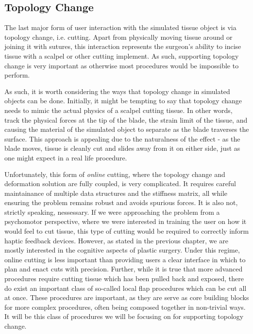 \documentclass[12pt,oneside,letterpaper]{memoir}
\begin{document}
  \subsection{Topology Change}

  The last major form of user interaction with the simulated tissue
  object is via topology change, i.e. cutting. Apart from physically
  moving tissue around or joining it with sutures, this interaction
  represents the surgeon's ability to incise tissue with a scalpel or
  other cutting implement. As such, supporting topology change is very
  important as otherwise most procedures would be impossible to
  perform.

  As such, it is worth considering the ways that topology change in
  simulated objects can be done. Initially, it might be tempting to
  say that topology change needs to mimic the actual physics of a
  scalpel cutting tissue. In other words, track the physical forces at
  the tip of the blade, the strain limit of the tissue, and causing
  the material of the simulated object to separate as the blade
  traverses the surface. This approach is appealing due to the
  naturalness of the effect - as the blade moves, tissue is cleanly
  cut and slides away from it on either side, just as one might expect
  in a real life procedure.

  Unfortunately, this form of \textit{online} cutting, where the
  topology change and deformation solution are fully coupled, is very
  complicated. It requires careful maintainance of multiple data
  structures and the stiffness matrix, all while ensuring the problem
  remains robust and avoids spurious forces. It is also not, strictly
  speaking, nessessary. If we were approaching the problem from a
  psychomotor perspective, where we were interested in training the
  user on how it would feel to cut tissue, this type of cutting would
  be required to correctly inform haptic feedback devices. However, as
  stated in the previous chapter, we are mostly interested in the
  cognitive aspects of plastic surgery. Under this regime, online
  cutting is less important than providing users a clear interface in
  which to plan and enact cuts with precision. Further, while it is
  true that more advanced procedures require cutting tissue which has
  been pulled back and exposed, there do exist an important class of
  so-called local flap procedures which can be cut all at once. These
  procedures are important, as they are serve as core building blocks
  for more complex procedures, often being composed together in
  non-trivial ways. It will be this class of procedures we will be
  focusing on for supporting topology change.
\end{document}

